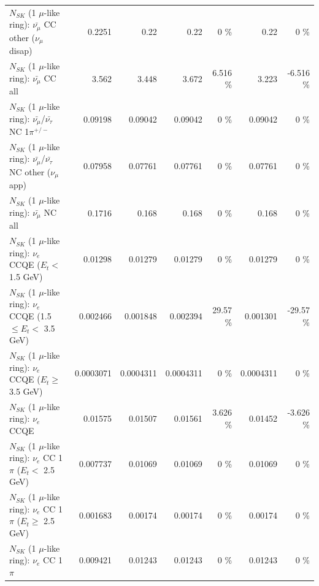 \begin{table}
\begin{tabular}{| l | r | r | r  r | r  r |}
        $N_{SK}$ (1 $\mu$-like ring): $\bar{\nu_\mu}$ CC other ($\nu_\mu$ disap) &          0.2251 &            0.22 &            0.22 &        0 \%  &            0.22 &        0 \%  \\ 
                          $N_{SK}$ (1 $\mu$-like ring): $\bar{\nu_{\mu}}$ CC all &           3.562 &           3.448 &           3.672 &    6.516 \%  &           3.223 &   -6.516 \%  \\ 
\hline
  $N_{SK}$ (1 $\mu$-like ring): $\bar{\nu_\mu}$/$\bar{\nu_\tau}$ NC 1$\pi^{+/-}$ &         0.09198 &         0.09042 &         0.09042 &        0 \%  &         0.09042 &        0 \%  \\ 
$N_{SK}$ (1 $\mu$-like ring): $\bar{\nu_\mu}$/$\bar{\nu_\tau}$ NC other ($\nu_\mu$ app) &         0.07958 &         0.07761 &         0.07761 &        0 \%  &         0.07761 &        0 \%  \\ 
                          $N_{SK}$ (1 $\mu$-like ring): $\bar{\nu_{\mu}}$ NC all &          0.1716 &           0.168 &           0.168 &        0 \%  &           0.168 &        0 \%  \\ 
\hline
\hline
\hline
                  $N_{SK}$ (1 $\mu$-like ring): $\nu_e$ CCQE ($E_{t} <$ 1.5 GeV) &         0.01298 &         0.01279 &         0.01279 &        0 \%  &         0.01279 &        0 \%  \\ 
         $N_{SK}$ (1 $\mu$-like ring): $\nu_e$ CCQE (1.5 $\leq E_{t} <$ 3.5 GeV) &        0.002466 &        0.001848 &        0.002394 &    29.57 \%  &        0.001301 &   -29.57 \%  \\ 
               $N_{SK}$ (1 $\mu$-like ring): $\nu_e$ CCQE ($E_{t} \geq$ 3.5 GeV) &       0.0003071 &       0.0004311 &       0.0004311 &        0 \%  &       0.0004311 &        0 \%  \\ 
\hline
                                      $N_{SK}$ (1 $\mu$-like ring): $\nu_e$ CCQE &         0.01575 &         0.01507 &         0.01561 &    3.626 \%  &         0.01452 &   -3.626 \%  \\ 
\hline
             $N_{SK}$ (1 $\mu$-like ring): $\nu_e$ CC 1$\pi$ ($E_{t} <$ 2.5 GeV) &        0.007737 &         0.01069 &         0.01069 &        0 \%  &         0.01069 &        0 \%  \\ 
          $N_{SK}$ (1 $\mu$-like ring): $\nu_e$ CC 1$\pi$ ($E_{t} \geq$ 2.5 GeV) &        0.001683 &         0.00174 &         0.00174 &        0 \%  &         0.00174 &        0 \%  \\ 
\hline
                                 $N_{SK}$ (1 $\mu$-like ring): $\nu_e$ CC 1$\pi$ &        0.009421 &         0.01243 &         0.01243 &        0 \%  &         0.01243 &        0 \%  \\ 

\end{tabular}
\end{table}
